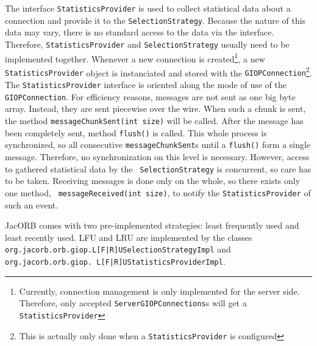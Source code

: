 The interface {\tt StatisticsProvider} is used to collect statistical data
about a connection and provide it to the {\tt SelectionStrategy}.  Because the
nature of this data may vary, there is no standard access to the data via the
interface. Therefore, {\tt StatisticsProvider} and {\tt SelectionStrategy}
usually need to be implemented together. Whenever a new connection is
created\footnote{Currently, connection management is only implemented for the
server side. Therefore, only accepted {\tt ServerGIOPConnections}s will get a
{\tt StatisticsProvider}}, a new {\tt StatisticsProvider} object is
instanciated and stored with the {\tt GIOPConnection}\footnote{This is
actually only done when a {\tt StatisticsProvider} is configured}.
The {\tt StatisticsProvider} interface is oriented along the mode of use of the {\tt
GIOPConnection}. For efficiency reasons, messages are not sent as one big byte
array. Instead, they are sent piecewise over the wire. When such a chunk is
sent, the method {\tt messageChunkSent(int size)} will be called. After the
message has been completely sent, method {\tt flush()} is called. This whole
process is synchronized, so all consecutive {\tt messageChunkSent}s until a
{\tt flush()} form a single message. Therefore, no synchronization on this
level is necessary. However, access to gathered statistical data by the {\tt
SelectionStrategy} is concurrent, so care has to be taken. Receiving messages
is done only on the whole, so there exists only one method, {\tt
messageReceived(int size)}, to notify the {\tt StatisticsProvider} of such an
event.


JacORB comes with two pre-implemented strategies: least frequently used and
least recently used. LFU and LRU are implemented by the classes {\tt
  org.jacorb.orb.giop.L[F|R]USelection\-StrategyImpl} and {\tt
  org.jacorb.orb.giop. L[F|R]U\-Statistics\-ProviderImpl}.

